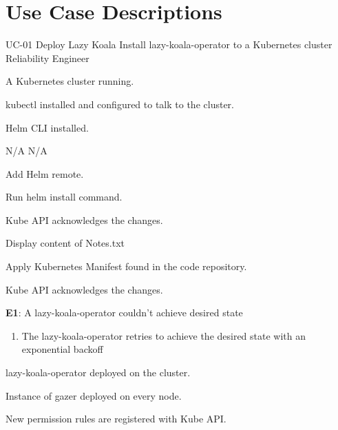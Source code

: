 {\let\clearpage\relax\chapter{Use Case Descriptions}\label{appendix:use-case-description}}

\UseCaseDescription
{UC-01}
{Deploy Lazy Koala}
{Install \ac{lazy-koala-operator} to a Kubernetes cluster}
{Reliability Engineer}
{\begin{CompactItemizes}
    \item A Kubernetes cluster running.
    \item kubectl installed and configured to talk to the cluster.
    \item Helm CLI installed.
\end{CompactItemizes}}
{N/A}
{N/A}
{\begin{CompactEnumerate}
    \item Add Helm remote.
    \item Run helm install command.
    \item Kube API acknowledges the changes.
    \item Display content of Notes.txt
\end{CompactEnumerate}}
{{\begin{CompactEnumerate}
    \item Apply Kubernetes Manifest found in the code repository.
    \item Kube API acknowledges the changes.
\end{CompactEnumerate}}
{\textbf{E1}: A \ac{lazy-koala-operator} couldn’t achieve desired state
\vspace{-4mm}\begin{enumerate}
    \item The \ac{lazy-koala-operator} retries to achieve the desired state with an exponential backoff
\vspace{-7mm}\end{enumerate}}
{\begin{CompactItemizes}
    \item \ac{lazy-koala-operator} deployed on the cluster.
    \item Instance of \ac{gazer} deployed on every node.
    \item New permission rules are registered with Kube API.
\end{CompactItemizes}}}

